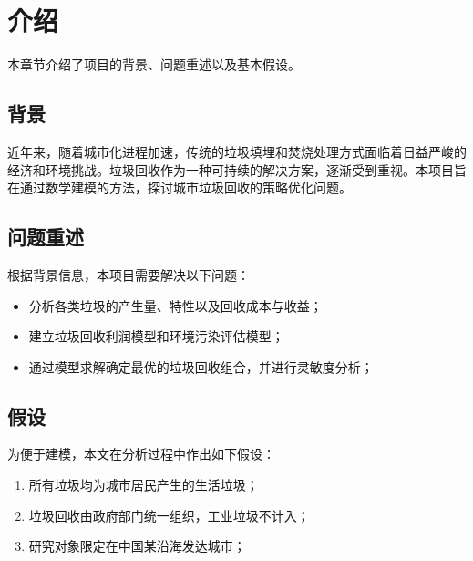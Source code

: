\section{介绍}
本章节介绍了项目的背景、问题重述以及基本假设。

\subsection{背景}
近年来，随着城市化进程加速，传统的垃圾填埋和焚烧处理方式面临着日益严峻的经济和环境挑战。垃圾回收作为一种可持续的解决方案，逐渐受到重视。本项目旨在通过数学建模的方法，探讨城市垃圾回收的策略优化问题。

\subsection{问题重述}
根据背景信息，本项目需要解决以下问题：
\begin{itemize}
  \item 分析各类垃圾的产生量、特性以及回收成本与收益；
  \item 建立垃圾回收利润模型和环境污染评估模型；
  \item 通过模型求解确定最优的垃圾回收组合，并进行灵敏度分析；
\end{itemize}

\subsection{假设}
为便于建模，本文在分析过程中作出如下假设：
\begin{enumerate}
  \item 所有垃圾均为城市居民产生的生活垃圾；
  \item 垃圾回收由政府部门统一组织，工业垃圾不计入；
  \item 研究对象限定在中国某沿海发达城市；
\end{enumerate}
